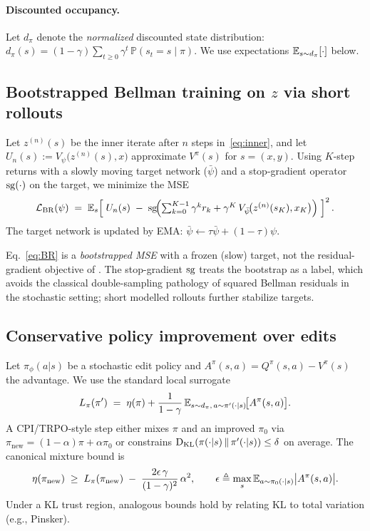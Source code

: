 \documentclass[11pt]{article}
\begin{document}
\paragraph{Discounted occupancy.}
Let $d_\pi$ denote the \emph{normalized} discounted state distribution:
$d_\pi(s)=(1-\gamma)\sum_{t\ge 0}\gamma^t\,\mathbb{P}(s_t=s\mid \pi)$.
We use expectations $\mathbb{E}_{s\sim d_\pi}[\cdot]$ below.

\subsection{Bootstrapped Bellman training on $z$ via short rollouts}
Let $z^{(n)}(s)$ be the inner iterate after $n$ steps in~\eqref{eq:inner}, and let $U_n(s)\!:=\!V_\psi\!\bigl(z^{(n)}(s),x\bigr)$ approximate $V^\pi(s)$ for $s=(x,y)$. Using $K$-step returns with a slowly moving target network ($\bar\psi$) and a stop-gradient operator $\operatorname{sg}(\cdot)$ on the target, we minimize the MSE
\begin{equation}
\mathcal{L}_{\mathrm{BR}}(\psi)\;=\;\mathbb{E}_{s}\!\left[\;U_n(s)\;-\;\operatorname{sg}\!\Bigl(\textstyle\sum_{k=0}^{K-1}\gamma^k r_k+\gamma^K\, V_{\bar\psi}\!\bigl(z^{(n)}(s_K),x_K\bigr)\Bigr)\;\right]^2.
\label{eq:BR}
\end{equation}
The target network is updated by EMA: $\bar\psi \leftarrow \tau\bar\psi + (1-\tau)\psi$.

\begin{remark}
Eq.~\eqref{eq:BR} is a \emph{bootstrapped MSE} with a frozen (slow) target, not the residual-gradient objective of \citet{Baird1995Residual}. The stop-gradient $\operatorname{sg}$ treats the bootstrap as a label, which avoids the classical double-sampling pathology of squared Bellman residuals in the stochastic setting; short modelled rollouts further stabilize targets.
\end{remark}

\subsection{Conservative policy improvement over edits}
Let $\pi_\phi(a|s)$ be a stochastic edit policy and $A^\pi(s,a)=Q^\pi(s,a)-V^\pi(s)$ the advantage. We use the standard local surrogate
\begin{equation}
L_\pi(\pi') \;=\; \eta(\pi) + \frac{1}{1-\gamma}\,\mathbb{E}_{s\sim d_\pi,\,a\sim\pi'(\cdot|s)}\!\bigl[A^\pi(s,a)\bigr].
\label{eq:surrogate}
\end{equation}
A CPI/TRPO-style step either mixes $\pi$ and an improved $\pi_0$ via $\pi_{\text{new}}=(1-\alpha)\pi+\alpha\pi_0$ or constrains $\mathrm{D}_{\mathrm{KL}}(\pi(\cdot|s)\,\|\,\pi'(\cdot|s))\le \delta$ on average. The canonical mixture bound is
\begin{equation}
\eta(\pi_{\text{new}})\;\ge\; L_\pi(\pi_{\text{new}})\;-\;\frac{2\epsilon\,\gamma}{(1-\gamma)^2}\,\alpha^2,
\qquad \epsilon \triangleq \max_{s}\mathbb{E}_{a\sim\pi_0(\cdot|s)}\bigl|A^\pi(s,a)\bigr|.
\label{eq:cpi_bound}
\end{equation}
Under a KL trust region, analogous bounds hold by relating KL to total variation (e.g., Pinsker).
\end{document}
